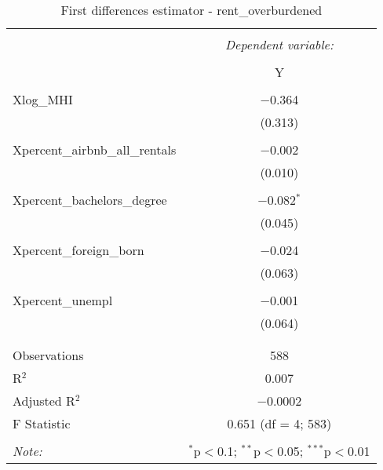 \documentclass{article}
\begin{document}
\begin{table}[!htbp] \centering 
  \caption{First differences estimator - rent\_overburdened} 
  \label{} 
  \begin{tabular}{@{\extracolsep{5pt}}lc} 
    \\[-1.8ex]\hline 
    \hline \\[-1.8ex] 
    & \multicolumn{1}{c}{\textit{Dependent variable:}} \\ 
    \cline{2-2} 
    \\[-1.8ex] & Y \\ 
    \hline \\[-1.8ex] 
    Xlog\_MHI & $-$0.364 \\ 
    & (0.313) \\ 
    & \\ 
    Xpercent\_airbnb\_all\_rentals & $-$0.002 \\ 
    & (0.010) \\ 
    & \\ 
    Xpercent\_bachelors\_degree & $-$0.082$^{*}$ \\ 
    & (0.045) \\ 
    & \\ 
    Xpercent\_foreign\_born & $-$0.024 \\ 
    & (0.063) \\ 
    & \\ 
    Xpercent\_unempl & $-$0.001 \\ 
    & (0.064) \\ 
    & \\ 
    \hline \\[-1.8ex] 
    Observations & 588 \\ 
    R$^{2}$ & 0.007 \\ 
    Adjusted R$^{2}$ & $-$0.0002 \\ 
    F Statistic & 0.651 (df = 4; 583) \\ 
    \hline 
    \hline \\[-1.8ex] 
    \textit{Note:}  & \multicolumn{1}{r}{$^{*}$p$<$0.1; $^{**}$p$<$0.05; $^{***}$p$<$0.01} \\ 
  \end{tabular} 
\end{table} 
\end{document}
